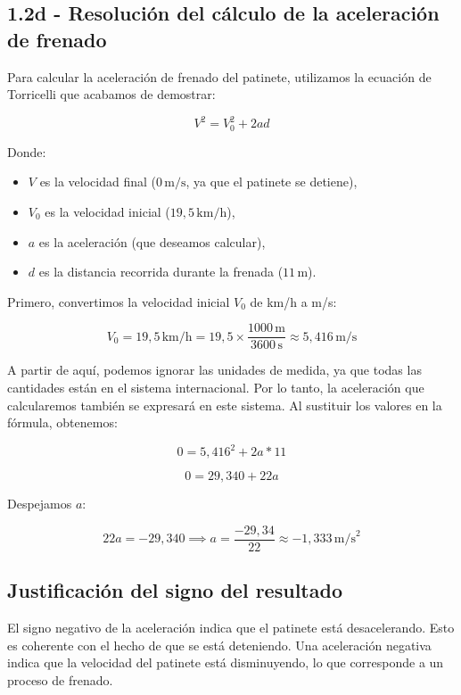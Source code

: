 \documentclass{article}
\begin{document}
\subsection*{1.2d - Resolución del cálculo de la aceleración de frenado}

Para calcular la aceleración de frenado del patinete, utilizamos la ecuación de Torricelli que acabamos de demostrar:

\[
V^2 = V_0^2 + 2ad
\]

Donde:
\begin{itemize}
    \item \(V\) es la velocidad final (\(0 \, \text{m/s}\), ya que el patinete se detiene),
    \item \(V_0\) es la velocidad inicial (\(19,5 \, \text{km/h}\)),
    \item \(a\) es la aceleración (que deseamos calcular),
    \item \(d\) es la distancia recorrida durante la frenada (\(11 \, \text{m}\)).
\end{itemize}

Primero, convertimos la velocidad inicial \(V_0\) de km/h a m/s:

\[
V_0 = 19,5 \, \text{km/h} = 19,5 \times \frac{1000 \, \text{m}}{3600 \, \text{s}} \approx 5,416 \, \text{m/s}
\]

\justify
A partir de aquí, podemos ignorar las unidades de medida, ya que todas las cantidades están en el sistema internacional. Por lo tanto, la aceleración que calcularemos también se expresará en este sistema. Al sustituir los valores en la fórmula, obtenemos:

\[
0 = 5,416^2 + 2a*11
\]

\[
0 = 29,340 + 22a
\]

Despejamos \(a\):

\[
22a = -29,340 \implies a = \frac{-29,34}{22} \approx \boxed{-1,333 \, \text{m/s}^2}
\]

\subsection*{Justificación del signo del resultado}

El signo negativo de la aceleración indica que el patinete está desacelerando. Esto es coherente con el hecho de que se está deteniendo. Una aceleración negativa indica que la velocidad del patinete está disminuyendo, lo que corresponde a un proceso de frenado.

\end{document}
